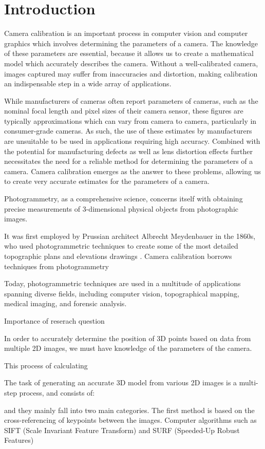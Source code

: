 \section{Introduction}

Camera calibration is an important process in computer vision and computer graphics which involves determining the parameters of a camera. The knowledge of these parameters are essential, because it allows us to create a mathematical model which accurately describes the camera. Without a well-calibrated camera, images captured may suffer from inaccuracies and distortion, making calibration an indispensable step in a wide array of applications.

While manufacturers of cameras often report parameters of cameras, such as the nominal focal length and pixel sizes of their camera sensor, these figures are typically approximations which can vary from camera to camera, particularly in consumer-grade cameras. As such, the use of these estimates by manufacturers are unsuitable to be used in applications requiring high accuracy. Combined with the potential for manufacturing defects as well as lens distortion effects further necessitates the need for a reliable method for determining the parameters of a camera. Camera calibration emerges as the answer to these problems, allowing us to create very accurate estimates for the parameters of a camera. 

Photogrammetry, as a comprehensive science, concerns itself with obtaining precise measurements of 3-dimensional physical objects from photographic images. 

It was first employed by Prussian architect Albrecht Meydenbauer in the 1860s, who used photogrammetric techniques to create some of the most detailed topographic plans and elevations drawings \autocite{ices2017}. 
Camera calibration borrows techniques from photogrammetry 

Today, photogrammetric techniques are used in a multitude of applications spanning diverse fields, including computer vision, topographical mapping, medical imaging, and forensic analysis.

Importance of reserach question

In order to accurately determine the position of 3D points based on data from multiple 2D images, we must have knowledge of the parameters of the camera.

This process of calculating




The task of generating an accurate 3D model from various 2D images is a multi-step process, and consists of:




and they mainly fall into two main categories. The first method is based on the cross-referencing of keypoints between the images. Computer algorithms such as SIFT (Scale Invariant Feature Transform) and SURF (Speeded-Up Robust Features)








